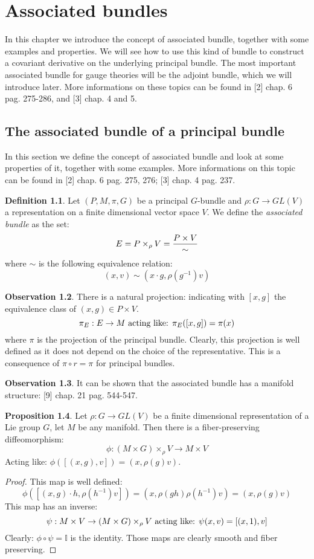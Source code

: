 \documentclass[12pt,a4paper]{report}
\theoremstyle{definition}
\newtheorem{Def}{Definition}[chapter]
\theoremstyle{Theorem}
\newtheorem{Prop}[Def]{Proposition}
\theoremstyle{definition}
\theoremstyle{definition}
\newtheorem{Obs}[Def]{Observation}
\begin{document}
	\chapter{Associated bundles}
	In this chapter we introduce the concept of associated bundle, together with some examples and properties. We will see how to use this kind of bundle to construct a covariant derivative on the underlying principal bundle. The most important associated bundle for gauge theories will be the adjoint bundle, which we will introduce later. More informations on these topics can be found in [2] chap. 6 pag. 275-286, and [3] chap. 4 and 5.
	\section{The associated bundle of a principal bundle}
	In this section we define the concept of associated bundle and look at some properties of it, together with some examples. More informations on this topic can be found in [2] chap. 6 pag. 275, 276; [3] chap. 4 pag. 237.
	\begin{Def}
		Let $(P,M,\pi,G)$ be a principal $G$-bundle and $\rho:G\rightarrow GL(V)$ a representation on a finite dimensional vector space $V$. We define the \textit{associated bundle} as the set: 
		$$E=P\times_\rho V={P\times V\over \sim}$$
		where $\sim$ is the following equivalence relation:
		$$(x,v)\sim(x\cdot g,\rho(g^{-1})v)$$ 
	\end{Def}
	\begin{Obs}
		There is a natural projection: indicating with $[x,g]$ the equivalence class of $(x,g)\in P\times V$.
		$$\pi_E:E\rightarrow M\hbox{ acting like: }\pi_E([x,g])=\pi(x)$$
		where $\pi$ is the projection of the principal bundle. Clearly, this projection is well defined as it does not depend on the choice of the representative. This is a consequence of $\pi\circ r=\pi$ for principal bundles.
	\end{Obs}
	\begin{Obs}
		It can be shown that the associated bundle has a manifold structure: [9] chap. 21 pag. 544-547.
	\end{Obs}
	\begin{Prop}\label{Prop_6.1.1}
		Let $\rho:G\rightarrow GL(V)$ be a finite dimensional representation of a Lie group $G$, let $M$ be any manifold. Then there is a fiber-preserving diffeomorphism:
		$$\phi:(M\times G)\times_\rho V\rightarrow M\times V$$
		Acting like: $\phi([(x,g),v])=(x,\rho(g)v)$.
	\end{Prop}
	\begin{proof}
		This map is well defined:
		$$\phi([(x,g)\cdot h,\rho(h^{-1})v])=(x,\rho(gh)\rho(h^{-1})v)=(x,\rho(g)v)$$
		This map has an inverse:
		$$\psi:M\times V\rightarrow (M\times G)\times_\rho V\hbox{ acting like: }
		\psi(x,v)=[(x,1),v]$$
		Clearly: $\phi\circ \psi=\mathbb{I}$ is the identity. Those maps are clearly smooth and fiber preserving.
	\end{proof}
\end{document}
